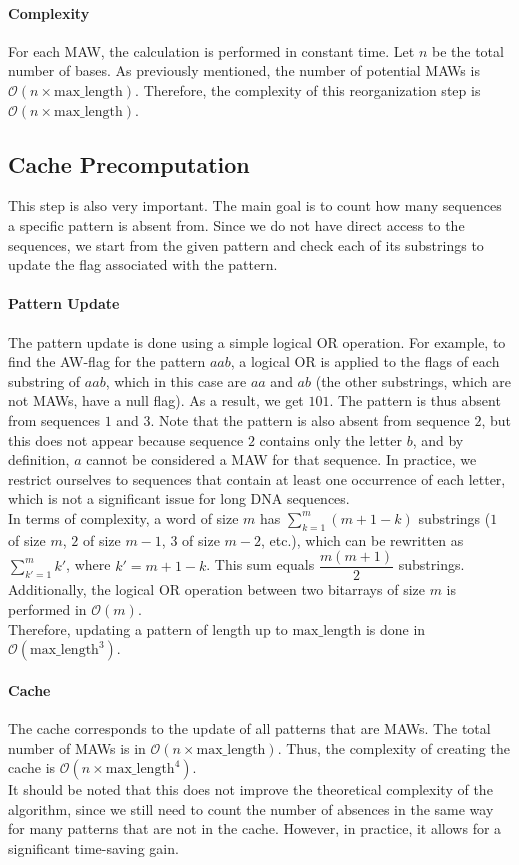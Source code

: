 \documentclass[conference]{IEEEtran}
\begin{document}
\paragraph{Complexity}
For each MAW, the calculation is performed in constant time. Let $n$ be the total number of bases. As previously mentioned, the number of potential MAWs is $\mathcal{O}(n \times \text{max\_length})$. Therefore, the complexity of this reorganization step is $\mathcal{O}(n \times \text{max\_length})$.
\subsection{Cache Precomputation}
This step is also very important. The main goal is to count how many sequences a specific pattern is absent from. Since we do not have direct access to the sequences, we start from the given pattern and check each of its substrings to update the flag associated with the pattern.\\
\paragraph{Pattern Update}
The pattern update is done using a simple logical OR operation. For example, to find the AW-flag for the pattern $aab$, a logical OR is applied to the flags of each substring of $aab$, which in this case are $aa$ and $ab$ (the other substrings, which are not MAWs, have a null flag). As a result, we get $101$. The pattern is thus absent from sequences $1$ and $3$. Note that the pattern is also absent from sequence $2$, but this does not appear because sequence $2$ contains only the letter $b$, and by definition, $a$ cannot be considered a MAW for that sequence. In practice, we restrict ourselves to sequences that contain at least one occurrence of each letter, which is not a significant issue for long DNA sequences.\\
In terms of complexity, a word of size $m$ has $\sum_{k=1}^{m} (m+1-k)$ substrings ($1$ of size $m$, $2$ of size $m-1$, $3$ of size $m-2$, etc.), which can be rewritten as $\sum_{k'=1}^{m} k'$, where $k' = m+1-k$. This sum equals $\dfrac{m(m+1)}{2}$ substrings.\\
Additionally, the logical OR operation between two bitarrays of size $m$ is performed in $\mathcal{O}(m)$.\\
Therefore, updating a pattern of length up to $\text{max\_length}$ is done in $\mathcal{O}(\text{max\_length}^3)$.\\
\paragraph{Cache}
The cache corresponds to the update of all patterns that are MAWs. The total number of MAWs is in $\mathcal{O}(n \times \text{max\_length})$. Thus, the complexity of creating the cache is $\mathcal{O}(n \times \text{max\_length}^4)$.\\
It should be noted that this does not improve the theoretical complexity of the algorithm, since we still need to count the number of absences in the same way for many patterns that are not in the cache. However, in practice, it allows for a significant time-saving gain.
\end{document}
